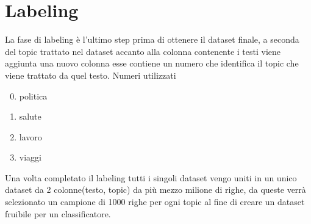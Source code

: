 \section{Labeling}
La fase di labeling è l'ultimo step prima di ottenere il dataset finale, a seconda del topic trattato nel dataset  accanto alla colonna contenente i testi viene aggiunta una nuovo colonna esse contiene un numero che identifica il topic che viene trattato da quel testo. Numeri utilizzati
\begin{enumerate}
    \setcounter{enumi}{-1}
    \item politica
    \item salute
    \item lavoro
    \item viaggi
\end{enumerate}
Una volta completato il labeling tutti i singoli dataset vengo uniti in un unico dataset da 2 colonne(testo, topic) da più mezzo milione di righe, da queste verrà selezionato un campione di 1000 righe per ogni topic al fine di creare un dataset fruibile per un classificatore.